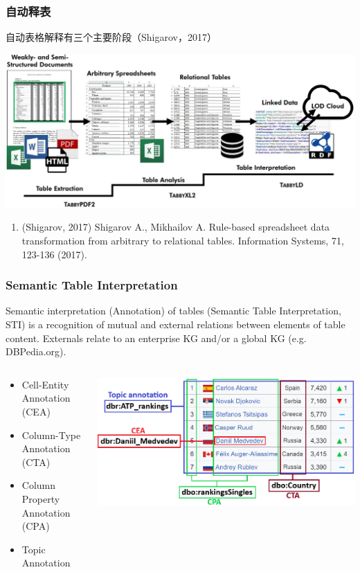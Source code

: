 \documentclass[10pt]{beamer}
\begin{document}
\begin{frame}
  \frametitle{自动释表}
自动表格解释有三个主要阶段（Shigarov，2017）

  \includegraphics[width=\linewidth]{table-descr-proc.jpg}

{\footnotesize
\begin{enumerate}
\item (Shigarov, 2017) Shigarov A., Mikhailov A. Rule-based spreadsheet data transformation from arbitrary to relational tables. Information Systems, 71, 123-136 (2017).
\end{enumerate}
}
\end{frame}

\begin{frame}
  \frametitle{Semantic Table Interpretation}

Semantic interpretation (Annotation) of tables (Semantic Table Interpretation, STI) is a recognition of mutual and external relations between elements of table content.  Externals relate to an enterprise KG and/or a global KG (e.g. DBPedia.org).

  \begin{columns}
    \begin{column}{0.4\textwidth}
      \begin{itemize}
      \item Cell-Entity Annotation (CEA)
      \item Column-Type Annotation (CTA)
      \item Column Property Annotation (CPA)
      \item Topic Annotation
      \end{itemize}
    \end{column}
    \begin{column}{0.7\textwidth}
    \includegraphics[width=\linewidth]{table-sem-interp.png}
  \end{column}
\end{columns}
\end{frame}
\end{document}
